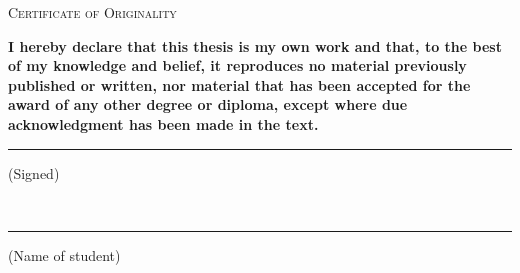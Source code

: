 \vspace{5cm}

\begin{center}
\textsc{\LARGE Certificate of Originality}
\end{center}

\vspace{2cm}
{\Large \bfseries I hereby declare that this thesis is my own work and that, to the best of my knowledge and belief, it reproduces no material previously published or written, nor material that has been accepted for the award of any other degree or diploma, except where due acknowledgment has been made in the text.}

\vfill

\begin{flushleft}
{\Large \bfseries \rule{8cm}{0.4pt} (Signed)}
\\[2cm]
{\Large \bfseries \rule{8cm}{0.4pt} (Name of student)}
\end{flushleft}
